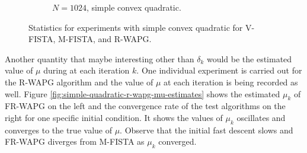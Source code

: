 \documentclass[12pt]{article}
\begin{document}
\begin{figure}[H]
\begin{subfigure}[b]{0.47\textwidth}
                    \caption{$N = 1024$, simple convex quadratic. }
                \end{subfigure}
                \caption{
                    Statistics for experiments with simple convex quadratic for V-FISTA, M-FISTA, and R-WAPG.
                }
                \label{fig:simple-quadratic-NOG}
            \end{figure}
            Another quantity that maybe interesting other than $\delta_k$ would be the estimated value of $\mu$ during at each iteration $k$.
            One individual experiment is carried out for the R-WAPG algorithm and the value of $\mu$ at each iteration is being recorded as well.
            Figure \ref{fig:simple-quadratic-r-wapg-mu-estimates} shows the estimated $\mu_k$ of FR-WAPG on the left and the convergence rate of the test algorithms on the right for one specific initial condition.
            It shows the values of $\mu_k$ oscillates and converges to the true value of $\mu$.
            Observe that the initial fast descent slows and FR-WAPG diverges from M-FISTA as $\mu_k$ converged.
\end{document}
